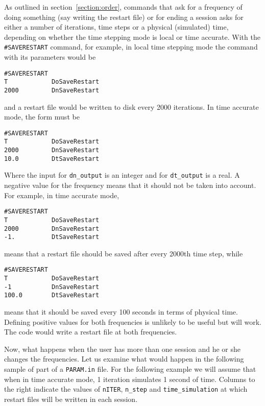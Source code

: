 As outlined in section~\ref{section:order}, commands that ask for a 
frequency of doing something (say 
writing the restart file) or for ending a session asks for either a number of
iterations, time steps or a physical (simulated) time, depending on whether the time
stepping mode is local or time accurate.
With the {\tt \#SAVERESTART} command, for example, in local time stepping mode
the command with its parameters would be
\begin{verbatim}
#SAVERESTART
T            DoSaveRestart
2000         DnSaveRestart
\end{verbatim}
and a restart file would be written to disk every 2000 iterations. In
time accurate mode, the form must be 
\begin{verbatim}
#SAVERESTART
T            DoSaveRestart
2000         DnSaveRestart
10.0         DtSaveRestart
\end{verbatim}
Where the input for {\tt dn\_output} is an integer and for {\tt dt\_output}
is a real.
A negative value for the frequency means that it should not be taken 
into account. For example, in time accurate mode,
\begin{verbatim}
#SAVERESTART
T            DoSaveRestart
2000         DnSaveRestart
-1.          DtSaveRestart
\end{verbatim}
means that a restart file should be saved after every 2000th time step, while
\begin{verbatim}
#SAVERESTART
T            DoSaveRestart
-1           DnSaveRestart
100.0        DtSaveRestart
\end{verbatim}
means that it should be saved every 100 seconds in terms of physical time.
Defining positive values for both frequencies is unlikely to be useful but will
work.  The code would write a restart file at both frequencies.

Now, what happens when the user has more than one session and he or she
changes the frequencies.  Let us examine what would happen in the following
sample of part of a {\tt PARAM.in} file.  For the following example we will
assume that when in time accurate mode, 1 iteration simulates 1 second of time.
Columns to the right indicate the values of {\tt nITER}, {\tt n\_step} and
{\tt time\_simulation} at which restart files will be written in each session.

\clearpage

